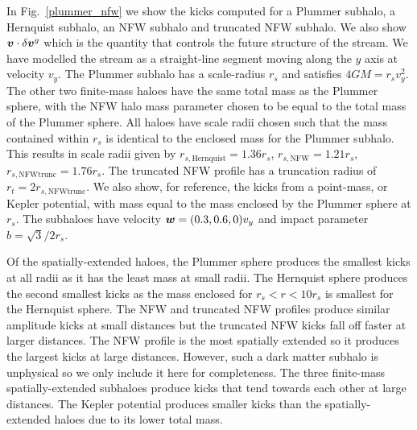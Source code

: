 \documentclass[useAMS,usenatbib,fleqn,a4paper]{mn2e}
\newcommand{\bs}[1]{\bmath{#1}}
\begin{document}
In Fig.~\ref{plummer_nfw} we show the kicks computed for a Plummer subhalo, a Hernquist subhalo, an NFW subhalo and truncated NFW subhalo. We also show $\bs{v}\cdot\delta\bs{v}^g$ which is the quantity that controls the future structure of the stream. We have modelled the stream as a straight-line segment moving along the $y$ axis at velocity $v_y$. The Plummer subhalo has a scale-radius $r_s$ and satisfies $4GM=r_sv_y^2$. The other two finite-mass haloes have the same total mass as the Plummer sphere, with the NFW halo mass parameter chosen to be equal to the total mass of the Plummer sphere. All haloes have scale radii chosen such that the mass contained within $r_s$ is identical to the enclosed mass for the Plummer subhalo. This results in scale radii given by $r_{s,\mathrm{Hernquist}}=1.36r_s$, $r_{s,\mathrm{NFW}}=1.21r_s$, $r_{s,\mathrm{NFW trunc}}=1.76r_s$. The truncated NFW profile has a truncation radius of $r_t=2r_{s,\mathrm{NFW trunc}}$. We also show, for reference, the kicks from a point-mass, or Kepler potential, with mass equal to the mass enclosed by the Plummer sphere at $r_s$. The subhaloes have velocity $\bs{w}=(0.3,0.6,0)v_y$ and impact parameter $b=\sqrt{3}/2r_s$.

Of the spatially-extended haloes, the Plummer sphere produces the smallest kicks at all radii as it has the least mass at small radii. The Hernquist sphere produces the second smallest kicks as the mass enclosed for $r_s<r<10r_s$ is smallest for the Hernquist sphere. The NFW and truncated NFW profiles produce similar amplitude kicks at small distances but the truncated NFW kicks fall off faster at larger distances. The NFW profile is the most spatially extended so it produces the largest kicks at large distances. However, such a dark matter subhalo is unphysical so we only include it here for completeness. The three finite-mass spatially-extended subhaloes produce kicks that tend towards each other at large distances. The Kepler potential produces smaller kicks than the spatially-extended haloes due to its lower total mass.
\end{document}
